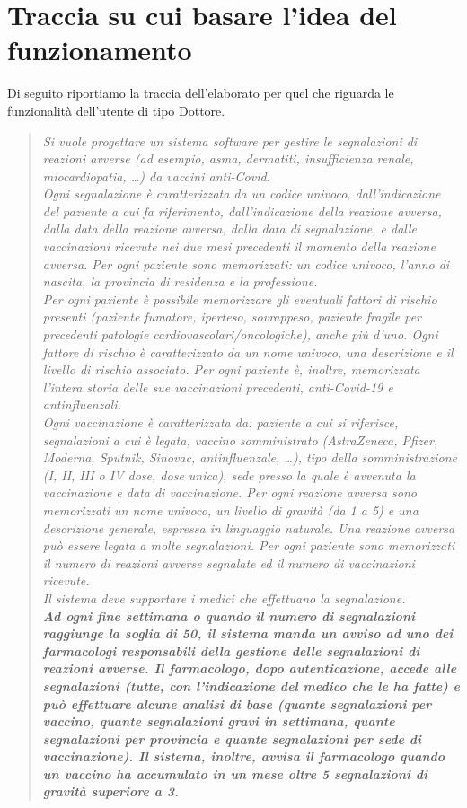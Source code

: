 \documentclass{article}
\begin{document}
\section{Traccia su cui basare l'idea del funzionamento}
    Di seguito riportiamo la traccia dell'elaborato per quel che riguarda le funzionalità dell'utente di tipo Dottore.
    \begin{quotation}
       \textit{Si vuole progettare un sistema software per gestire le segnalazioni di reazioni avverse (ad esempio, asma, dermatiti, insufficienza renale, miocardiopatia, \dots) da vaccini anti-Covid.\\
        Ogni segnalazione è caratterizzata da un codice univoco, dall'indicazione del paziente a cui fa riferimento, dall'indicazione della reazione avversa, dalla data della reazione avversa, dalla data di segnalazione, e dalle vaccinazioni ricevute nei due mesi precedenti il momento della reazione avversa.
        Per ogni paziente sono memorizzati: un codice univoco, l'anno di nascita, la provincia di residenza e la professione.\\
        Per ogni paziente è possibile memorizzare gli eventuali fattori di rischio presenti (paziente fumatore, iperteso, sovrappeso, paziente fragile per precedenti patologie cardiovascolari/oncologiche), anche più d'uno. Ogni fattore di rischio è caratterizzato da un nome univoco, una descrizione e il livello di rischio associato. Per ogni paziente è, inoltre, memorizzata l'intera storia delle sue vaccinazioni precedenti, anti-Covid-19 e antinfluenzali.\\
        Ogni vaccinazione è caratterizzata da: paziente a cui si riferisce, segnalazioni a cui è legata, vaccino somministrato (AstraZeneca, Pfizer, Moderna, Sputnik, Sinovac, antinfluenzale, \dots), tipo della somministrazione (I, II, III o IV dose, dose unica), sede presso la quale è avvenuta la vaccinazione e data di vaccinazione. Per ogni reazione avversa sono memorizzati un nome univoco, un livello di gravità (da 1 a 5) e una descrizione generale, espressa in linguaggio naturale. Una reazione avversa può essere legata a molte segnalazioni. Per ogni paziente sono memorizzati il numero di reazioni avverse segnalate ed il numero di vaccinazioni ricevute.\\
        Il sistema deve supportare i medici che effettuano la segnalazione.\\
        \textbf{Ad ogni fine settimana o quando il numero di segnalazioni raggiunge la soglia di 50, il sistema manda un avviso ad uno dei farmacologi responsabili della gestione delle segnalazioni di reazioni avverse. Il farmacologo, dopo autenticazione, accede alle segnalazioni (tutte, con l'indicazione del medico che le ha fatte) e può effettuare alcune analisi di base (quante segnalazioni per vaccino, quante segnalazioni gravi in settimana, quante segnalazioni per provincia e quante segnalazioni per sede di vaccinazione). Il sistema, inoltre, avvisa il farmacologo quando un vaccino ha accumulato in un mese oltre 5 segnalazioni di gravità superiore a 3.
}}
\end{quotation}
\end{document}

